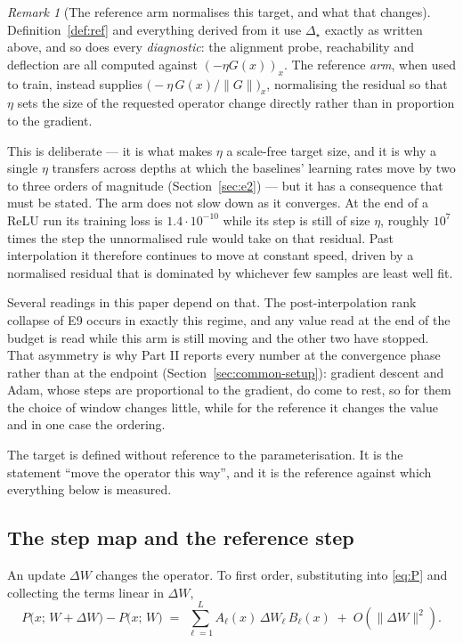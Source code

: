\documentclass{article} %
\theoremstyle{plain}
\theoremstyle{definition}
\theoremstyle{remark}
\newtheorem{remark}[theorem]{Remark}
\begin{document}
\begin{remark}[The reference arm normalises this target, and what that changes]
\label{rem:normalise}
Definition~\ref{def:ref} and everything derived from it use $\Delta_\star$ exactly as written above,
and so does every \emph{diagnostic}: the alignment probe, reachability and deflection are all
computed against $(-\eta G(x))_x$. The reference \emph{arm}, when used to train, instead supplies
$\big(-\eta\, G(x)/\|G\|\big)_x$, normalising the residual so that $\eta$ sets the size of the
requested operator change directly rather than in proportion to the gradient.

This is deliberate --- it is what makes $\eta$ a scale-free target size, and it is why a single
$\eta$ transfers across depths at which the baselines' learning rates move by two to three orders
of magnitude (Section~\ref{sec:e2}) --- but it has a consequence that must be stated. The arm does
not slow down as it converges. At the end of a ReLU run its training loss is $1.4\cdot10^{-10}$
while its step is still of size $\eta$, roughly $10^{7}$ times the step the unnormalised rule would
take on that residual. Past interpolation it therefore continues to move at constant speed, driven
by a normalised residual that is dominated by whichever few samples are least well fit.

Several readings in this paper depend on that. The post-interpolation rank collapse of E9 occurs in
exactly this regime, and any value read at the end of the budget is read while this arm is still
moving and the other two have stopped. That asymmetry is why Part II reports every number at the
convergence phase rather than at the endpoint (Section~\ref{sec:common-setup}): gradient descent and Adam,
whose steps are proportional to the gradient, do come to rest, so for them the choice of window
changes little, while for the reference it changes the value and in one case the ordering.
\end{remark}

The target is defined without reference to the parameterisation. It is the statement ``move the
operator this way'', and it is the reference against which everything below is measured.

\subsection{The step map and the reference step}
\label{sec:stepmap}

An update $\Delta W$ changes the operator. To first order, substituting into \eqref{eq:P} and
collecting the terms linear in $\Delta W$,
\begin{equation}
  P\big(x;\, W + \Delta W\big) - P\big(x;\, W\big)
  \;=\; \sum_{\ell=1}^{L} A_\ell(x)\, \Delta W_\ell\, B_\ell(x) \;+\; O\!\left(\|\Delta W\|^2\right).
  \label{eq:firstorder}
\end{equation}
\end{document}
